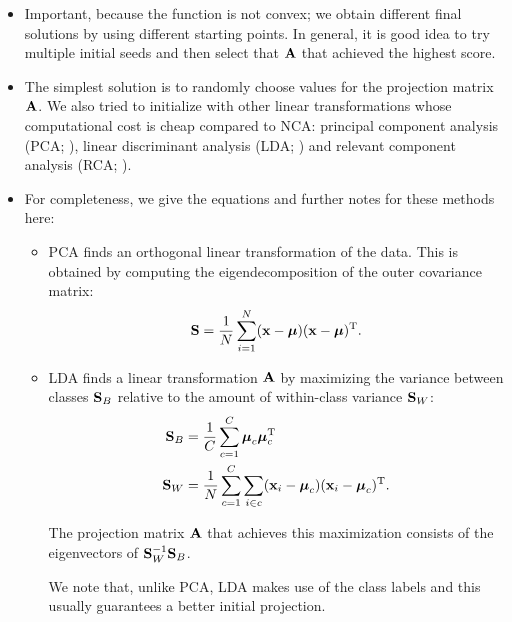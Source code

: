\begin{itemize}
    \item Important, because the function is not convex; we
        obtain different final solutions by using different
        starting points. In general, it is good idea to try
        multiple initial seeds and then select that $\mathbf{A}$ that
        achieved the highest score.
    \item The simplest solution is to randomly choose values
        for the projection matrix $\mathbf{A}$. We also tried to
        initialize with other linear transformations whose
        computational cost is cheap compared to NCA: principal
        component analysis (PCA; \citealp{pearson1901}),
        linear discriminant analysis (LDA;
        \citealp{fisher1936}) and relevant component analysis
        (RCA; \citealp{bar2003}).
    \item For completeness, we give the equations and further notes for these
methods here:
        \begin{itemize}
            \item  PCA finds an orthogonal linear
                transformation of the data. This is
                obtained by computing the
                eigendecomposition of the outer covariance
                matrix:
                \begin{align}
                    \mathbf{S} = \frac{1}{N}\sum_{i=1}^N (\mathbf{x}-\mbox{\boldmath $\mu$})(\mathbf{x}-\mbox{\boldmath $\mu$})^\textrm{T}.
                    \label{eq:pca-1}
                \end{align}

            \item LDA finds a linear transformation $\mathbf{A}$ by maximizing the
variance between classes $\mathbf{S}_B$ relative to the amount of within-class variance
$\mathbf{S}_W$:
            \begin{align}
             \mathbf{S}_B &=
\frac{1}{C}\sum_{c=1}^{C}\boldsymbol\mu_c\boldsymbol\mu_c^\textrm{T}\label{eq:lda-1}\\
             \mathbf{S}_W &= \frac{1}{N}\sum_{c=1}^{C}\sum_{i \in
c}(\mathbf{x}_i-\boldsymbol{\mbox{\boldmath $\mu$}}_c)(\mathbf{x}_i-\boldsymbol{\mu}_c)^\textrm{T}.\label{eq:lda-2}
            \end{align}

            The projection matrix $\mathbf{A}$ that achieves this maximization consists
of the eigenvectors of $\mathbf{S}_W^{-1}\mathbf{S}_B$.

            We note that, unlike PCA, LDA makes use of the class labels and this
usually guarantees a better initial projection.


\end{itemize}
\end{itemize}
